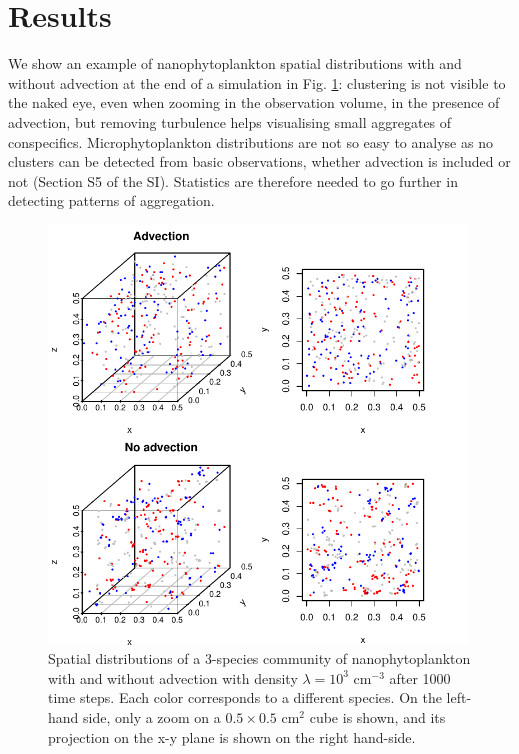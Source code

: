 \documentclass[english]{article}
\begin{document}
\section*{Results}

We show an example of nanophytoplankton spatial distributions with
and without advection at the end of a simulation in Fig. \ref{fig:Spatial-distributions}:
clustering is not visible to the naked eye, even when zooming in the
observation volume, in the presence of advection, but removing turbulence
helps visualising small aggregates of conspecifics. Microphytoplankton
distributions are not so easy to analyse as no clusters can be detected
from basic observations, whether advection is included or not (Section
S5 of the SI). Statistics are therefore needed to go further in detecting
patterns of aggregation.

\begin{figure}[H]
\begin{centering}
\includegraphics[width=0.99\textwidth]{../code/figure/spatial_distribution_zoom_nano}
\par\end{centering}
\caption{Spatial distributions of a 3-species community of nanophytoplankton
with and without advection with density $\lambda=10^{3}$ cm$^{-3}$
after 1000 time steps. Each color corresponds to a different species.
On the left-hand side, only a zoom on a $0.5\times0.5$ cm$^{2}$
cube is shown, and its projection on the x-y plane is shown on the
right hand-side. \label{fig:Spatial-distributions} }
\end{figure}
\end{document}
